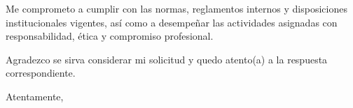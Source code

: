 \documentclass[a4paper,12pt]{article}
\begin{document}
\vspace{0.5cm}

\noindent Me comprometo a cumplir con las normas, reglamentos internos y disposiciones institucionales vigentes, así como a desempeñar las actividades asignadas con responsabilidad, ética y compromiso profesional.

\vspace{0.5cm}

\noindent Agradezco se sirva considerar mi solicitud y quedo atento(a) a la respuesta correspondiente.

\noindent Atentamente,

\vspace{2.5cm}


\noindent{}  

\noindent{}   

\noindent{} 

\noindent{} 
\end{document}
